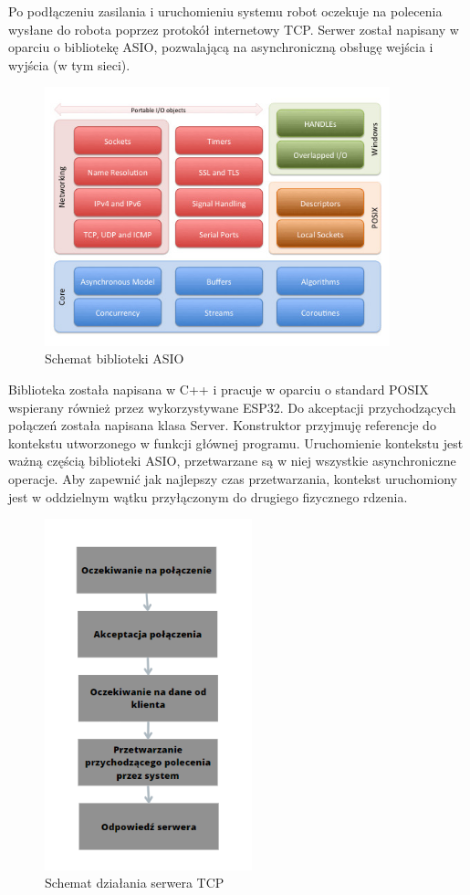 Po podłączeniu zasilania i uruchomieniu systemu robot oczekuje na polecenia wysłane do robota poprzez protokół internetowy TCP. Serwer został napisany w oparciu o bibliotekę ASIO, pozwalającą na asynchroniczną obsługę wejścia i wyjścia (w tym sieci).
\begin{figure}[H]
	\centering
	\includegraphics[width=10cm]{pages/robot/zdjecia/schematy/schematASIO.jpg}
	\caption{Schemat biblioteki ASIO \cite{asio}}
	\label{Fig:schematASIO}
\end{figure}
Biblioteka została napisana w C++ i pracuje w oparciu o standard POSIX wspierany również przez wykorzystywane ESP32.
Do akceptacji przychodzących połączeń została napisana klasa Server. Konstruktor przyjmuję referencje do kontekstu utworzonego w funkcji głównej programu. 
Uruchomienie kontekstu jest ważną częścią biblioteki ASIO, przetwarzane są w niej wszystkie asynchroniczne operacje.
Aby zapewnić jak najlepszy czas przetwarzania, kontekst uruchomiony jest w oddzielnym wątku przyłączonym do drugiego fizycznego rdzenia.

\begin{figure}[H]
	\centering
	\includegraphics[width=6cm]{pages/robot/zdjecia/schematy/schematTCP.png}
	\caption{Schemat działania serwera TCP}
	\label{Fig:schematSerweraTCP}
\end{figure}

